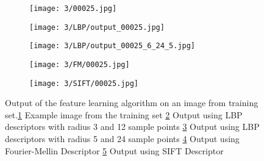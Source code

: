 \documentclass[draft,final]{vutinfth} %
\begin{document}
\begin{figure}[h]
  \centering
  \begin{subfigure}[t]{0.19\columnwidth}
    \centering
    \texttt{[image: 3/00025.jpg]}
    \subcaption{}
    \label{fig:pe:25:orig}
  \end{subfigure}
  \begin{subfigure}[t]{0.19\columnwidth}
    \centering
    \texttt{[image: 3/LBP/output\_00025.jpg]}
    \subcaption{}
    \label{fig:pe:25:LBPs}
  \end{subfigure}
  \begin{subfigure}[t]{0.19\columnwidth}
    \centering
    \texttt{[image: 3/LBP/output\_00025\_6\_24\_5.jpg]}
    \subcaption{}
    \label{fig:pe:25:LBPb}
  \end{subfigure}
  \begin{subfigure}[t]{0.19\columnwidth}
    \centering
    \texttt{[image: 3/FM/00025.jpg]}
    \subcaption{}
    \label{fig:pe:25:FM}
  \end{subfigure}
  \begin{subfigure}[t]{0.19\columnwidth}
    \centering
    \texttt{[image: 3/SIFT/00025.jpg]}
    \subcaption{}
    \label{fig:pe:25:SIFT}
  \end{subfigure}
  \caption{Output of the feature learning algorithm on an image from training set.\ref{fig:pe:25:orig} Example image from the training set \ref{fig:pe:25:LBPs} Output using LBP descriptors with radius 3 and 12 sample points \ref{fig:pe:25:LBPb} Output using LBP descriptors with radius 5 and 24 sample points \ref{fig:pe:25:FM} Output using Fourier-Mellin Descriptor \ref{fig:pe:25:SIFT} Output using SIFT Descriptor}
  \label{fig:pe:25}
\end{figure}
\end{document}
